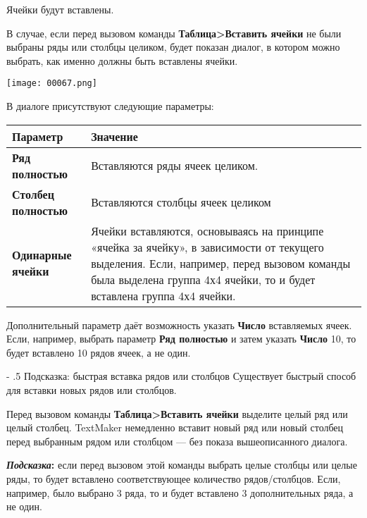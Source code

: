 ﻿\documentclass[a4paper,10pt]{article}
\makeatletter
\renewcommand\paragraph{%
   \@startsection{paragraph}{4}{0mm}%
      {-\baselineskip}%
      {.5\baselineskip}%
      {\normalfont\normalsize\bfseries}}
\makeatother
\begin{document}
Ячейки будут вставлены.

В случае, если перед вызовом команды \textbf{Таблица>Вставить ячейки} не были выбраны ряды или столбцы целиком, будет показан диалог, в котором можно выбрать, как именно должны быть вставлены ячейки.

\texttt{[image: 00067.png]}

В диалоге присутствуют следующие параметры:

\begin{center}
\begin{tabular}{  m{4cm}  m{12cm}  }
 \textbf{Параметр} & \textbf{Значение} \\ 
 \hline
  \textbf{Ряд полностью} & Вставляются ряды ячеек целиком.\\
  \textbf{Столбец полностью} & Вставляются столбцы ячеек целиком\\ 
\textbf{Одинарные ячейки} & Ячейки вставляются, основываясь на принципе «ячейка за ячейку», в зависимости от текущего выделения. Если, например, перед вызовом команды была выделена группа 4х4 ячейки, то и будет вставлена группа 4х4 ячейки.\\
\end{tabular}
\end{center}

Дополнительный параметр даёт возможность указать \textbf{Число} вставляемых ячеек. Если, например, выбрать параметр \textbf{Ряд полностью} и затем указать \textbf{Число} 10, то будет вставлено 10 рядов ячеек, а не один.

\paragraph{Подсказка: быстрая вставка рядов или столбцов}
Существует быстрый способ для вставки новых рядов или столбцов.

Перед вызовом команды \textbf{Таблица>Вставить ячейки} выделите целый ряд или целый столбец. TextMaker немедленно вставит новый ряд или новый столбец перед выбранным рядом или столбцом — без показа вышеописанного диалога.

\begin{mdframed}[backgroundcolor=blue!10]
\textbf{\textit{Подсказка}:} если перед вызовом этой команды выбрать целые столбцы или целые ряды, то будет вставлено соответствующее количество рядов/столбцов. Если, например, было выбрано 3 ряда, то и будет вставлено 3 дополнительных ряда, а не один.
\end{mdframed}
\end{document}
